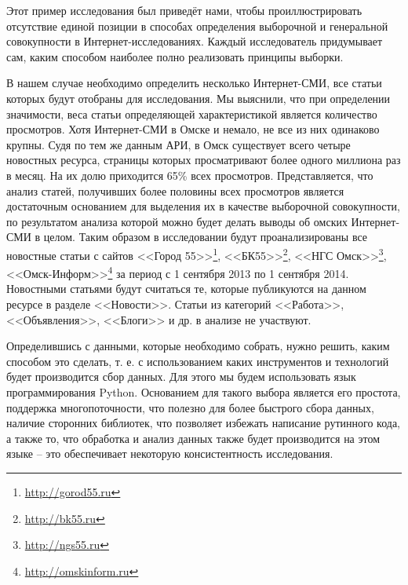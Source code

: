 Этот пример исследования был приведёт нами, чтобы проиллюстрировать отсутствие единой позиции в способах определения выборочной и генеральной совокупности в Интернет-исследованиях. Каждый исследователь придумывает сам, каким способом наиболее полно реализовать принципы выборки.

В нашем случае необходимо определить несколько Интернет-СМИ, все статьи которых будут отобраны для исследования. Мы выяснили, что при определении значимости, веса статьи определяющей характеристикой является количество просмотров. Хотя Интернет-СМИ в Омске и немало, не все из них одинаково крупны. Судя по тем же данным АРИ, в Омск существует всего четыре новостных ресурса, страницы которых просматривают более одного миллиона раз в месяц. На их долю приходится 65\% всех просмотров. Представляется, что анализ статей, получивших более половины всех просмотров является достаточным основанием для выделения их в качестве выборочной совокупности, по результатом анализа которой можно будет делать выводы об омских Интернет-СМИ в целом. Таким образом в исследовании будут проанализированы все новостные статьи с сайтов <<Город 55>>\footnote{\href{http://gorod55.ru}{http://gorod55.ru}}, <<БК55>>\footnote{\href{http://bk55.ru}{http://bk55.ru}}, <<НГС Омск>>\footnote{\href{http://ngs55.ru}{http://ngs55.ru}}, <<Омск-Информ>>\footnote{\href{http://omskinform.ru}{http://omskinform.ru}} за период с 1 сентября 2013 по 1 сентября 2014. Новостными статьями будут считаться те, которые публикуются на данном ресурсе в разделе <<Новости>>. Статьи из категорий <<Работа>>, <<Объявления>>, <<Блоги>> и др. в анализе не участвуют.

Определившись с данными, которые необходимо собрать, нужно решить, каким способом это сделать, т. е. с использованием каких инструментов и технологий будет производится сбор данных. Для этого мы будем использовать язык программирования Python. Основанием для такого выбора является его простота, поддержка многопоточности, что полезно для более быстрого сбора данных, наличие сторонних библиотек, что позволяет избежать написание рутинного кода, а также то, что обработка и анализ данных также будет производится на этом языке -- это обеспечивает некоторую консистентность исследования. %

